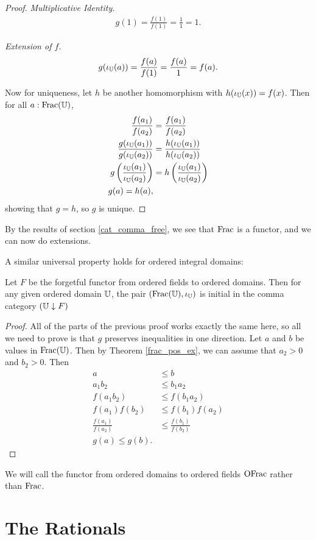 \documentclass[../../math.tex]{subfiles}
\begin{document}
\begin{proof}
    \textit{Multiplicative Identity.}
    \begin{align*}
        g(1) = \frac{f(1)}{f(1)} = \frac{1}{1} = 1.
    \end{align*}

    \textit{Extension of $f$.}
    \begin{align*}
        g(\iota_{\mathbb{U}}(a)) = \frac{f(a)}{f(1)} = \frac{f(a)}{1} = f(a).
    \end{align*}

    Now for uniqueness, let $h$ be another homomorphism with $h(\iota_{\mathbb{U}}(x)) =
    f(x)$.  Then for all $a : \operatorname{Frac}(\mathbb{U})$,
    \begin{align*}
        \frac{f(a_1)}{f(a_2)} &= \frac{f(a_1)}{f(a_2)} \\
        \frac{g(\iota_{\mathbb{U}}(a_1))}{g(\iota_{\mathbb{U}}(a_2))} &=
            \frac{h(\iota_{\mathbb{U}}(a_1))}{h(\iota_{\mathbb{U}}(a_2))} \\
        g \left( \frac{\iota_{\mathbb{U}}(a_1)}{\iota_{\mathbb{U}}(a_2)} \right) &=
            h \left( \frac{\iota_{\mathbb{U}}(a_1)}{\iota_{\mathbb{U}}(a_2)} \right) \\
        g(a) = h(a),
    \end{align*}
    showing that $g = h$, so $g$ is unique.
\end{proof}

By the results of section \ref{cat_comma_free}, we see that $\operatorname{Frac}$ is a
functor, and we can now do extensions.

A similar universal property holds for ordered integral domains:

\begin{theorem}
    Let $F$ be the forgetful functor from ordered fields to ordered domains.
    Then for any given ordered domain $\mathbb{U}$, the pair $(\operatorname{Frac}(\mathbb{U}), \iota_{\mathbb{U}})$ is
    initial in the comma category $(\mathbb{U} \downarrow F)$
\end{theorem}
\begin{proof}
    All of the parts of the previous proof works exactly the same here, so all
    we need to prove is that $g$ preserves inequalities in one direction.  Let
    $a$ and $b$ be values in $\operatorname{Frac}(\mathbb{U})$.  Then by Theorem \ref{frac_pos_ex}, we
    can assume that $a_2 > 0$ and $b_2 > 0$.  Then
    \begin{align*}
        a &\leq b \\
        a_1b_2 &\leq b_1a_2 \\
        f(a_1b_2) &\leq f(b_1a_2) \\
        f(a_1)f(b_2) &\leq f(b_1)f(a_2) \\
        \frac{f(a_1)}{f(a_2)} &\leq \frac{f(b_1)}{f(b_2)} \\
        g(a) \leq g(b).
    \end{align*}
\end{proof}

We will call the functor from ordered domains to ordered fields $\operatorname{OFrac}$ rather
than $\operatorname{Frac}$.

\section{The Rationals}
\end{document}
